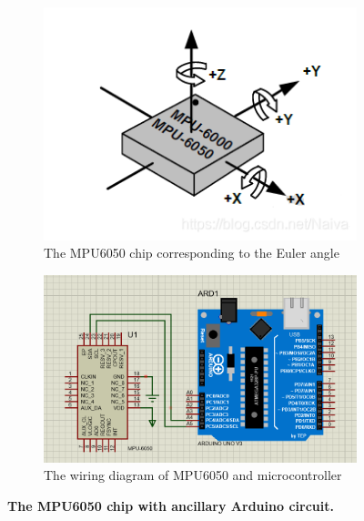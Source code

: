 \begin{figure}[H] %
    \centering
    \captionsetup{labelsep=colon}
    \begin{subfigure}{0.45\textwidth} %
        \centering
        \includegraphics[width=\linewidth]{Image/Design/MPU6050_chip.png}
        \caption{\centering The MPU6050 chip corresponding to the Euler angle}
        \label{fig:mpu6050_chip}
    \end{subfigure}
    \begin{subfigure}{0.45\textwidth} %
        \centering
        \includegraphics[width=\linewidth]{Image/Design/MPU6050_circuit.png}
        \caption{\centering The wiring diagram of MPU6050 and microcontroller}
        \label{fig:mpu6050_circuit}
    \end{subfigure}
    \caption[The MPU6050 chip with ancillary Arduino circuit]
    {\centering \textbf{The MPU6050 chip with ancillary Arduino circuit.}}
    \label{fig:mpu6050}
\end{figure}
\vspace{-5mm}

